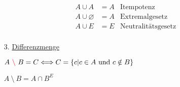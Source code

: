 \begin{itemize}[leftmargin=*]
\begin{align*}
                        A \cup A &= A & \text{Itempotenz} \\
                        A \cup \varnothing &= A & \text{Extremalgesetz} \\
                        A \cup E &= E & \text{Neutralitätsgesetz} \\
                        \end{align*}
                    \item[3.] \underline{Differenzmenge}
                    \item[] $A \ \textcolor{red}{\setminus} \ B = C \Longleftrightarrow C = \{c|c \in A ~\text{und}~ c \notin B \}$
                    \item[] $A \ \setminus \ B = A \cap B^E$
                    \item[]   
                \end{itemize} 
            
                      
